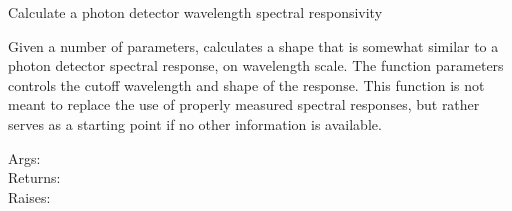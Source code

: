 \documentclass[a4paper,10pt,english]{sphinxmanual}
\begin{document}
\begin{fulllineitems}
\label{ryutils:pyradi.ryutils.responsivity}
Calculate a photon detector wavelength spectral responsivity

Given a number of parameters, calculates a shape that is somewhat similar to a photon
detector spectral response, on wavelength scale. The function parameters controls the
cutoff wavelength and shape of the response. This function is not meant to replace the use
of properly measured  spectral responses, but rather serves as a starting point if no other
information is available.
\begin{description}
\item[{Args:}] \leavevmode
{}

\item[{Returns:}] \leavevmode
{}

\item[{Raises:}] \leavevmode
{}

\end{description}

\end{fulllineitems}

\end{document}
